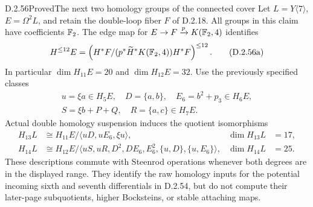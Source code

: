 \begin{claim}{D.2.56}{Proved}{The next two homology groups of the connected cover}
Let $L=Y\langle7\rangle$, $E=\Omega^2L$, and retain the
double-loop fiber $F$ of D.2.18.  All groups in this claim have
coefficients $\mathbb F_2$.  The edge map for
$E\to F\xrightarrow{p}K(\mathbb F_2,4)$ identifies
\[
 H^{\le12}E=
 \left(H^*F/(p^*\widetilde H^*K(\mathbb F_2,4))H^*F\right)^{\le12}.
 \tag{D.2.56a}
\]
In particular $\dim H_{11}E=20$ and $\dim H_{12}E=32$.
Use the previously specified classes
\[
 \begin{gathered}
 u=\xi a\in H_5E,\quad D=\{a,b\},\quad E_6=b^2+p_3\in H_6E,\\
 S=\xi b+P+Q,\quad R=\{a,c\}\in H_7E.
 \end{gathered}
 \tag{D.2.56b}
\]
Actual double homology suspension induces the quotient isomorphisms
\[
 \begin{aligned}
 H_{13}L&\cong H_{11}E/\langle uD,uE_6,\xi u\rangle,
                 &\dim H_{13}L&=17,\\
 H_{14}L&\cong H_{12}E/
 \langle uS,uR,D^2,DE_6,E_6^2,\{u,D\},\{u,E_6\}\rangle,
                 &\dim H_{14}L&=25.
 \end{aligned}
 \tag{D.2.56c}
\]
These descriptions commute with Steenrod operations whenever both
degrees are in the displayed range.  They identify the raw homology
inputs for the potential incoming sixth and seventh differentials
in D.2.54, but do not compute their later-page subquotients, higher
Bocksteins, or stable attaching maps.
\end{claim}
